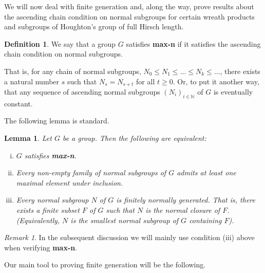 \documentclass[11pt,a4paper]{amsart}
\newtheorem{lemma}[theorem]{Lemma}
\theoremstyle{definition}
\newtheorem{definition}[theorem]{Definition}
\theoremstyle{remark}
\newtheorem{remark}[theorem]{Remark}
\newcommand{\N}{\mathbb N}
\begin{document}
We will now deal with finite generation and, along the way, prove results about the ascending chain condition on normal subgroups for certain wreath products and subgroups of Houghton's group of full Hirsch length. 

\begin{definition}
	\label{maxn}
	We say that a group $G$ satisfies \textbf{max-n} if it satisfies the ascending chain condition on normal subgroups. 
	
	That is, for any chain of normal subgroups, $N_0 \leq N_1 \leq \ldots \leq N_k \leq \ldots$, there exists a natural number $s$ such that $N_s=N_{s+t}$ for all $t \geq 0$. Or, to put it another way, that any sequence of ascending normal subgroups $(N_i)_{i\in\N}$ of $G$ is eventually constant.
\end{definition}

The following lemma is standard.

\begin{lemma}
	Let $G$ be a group. Then the following are equivalent:
	\begin{enumerate}[(i)]
		\item $G$ satisfies \textbf{max-n}.
		\item Every non-empty family of normal subgroups of $G$ admits at least one maximal element under inclusion.
		\item Every normal subgroup $N$ of $G$ is finitely normally generated. That is, there exists a finite subset $F$ of $G$ such that $N$ is the normal closure of $F$. (Equivalently, $N$ is the smallest normal subgroup of $G$ containing $F$).
	\end{enumerate}
\end{lemma}


\begin{remark}
	In the subsequent discussion we will mainly use condition (iii) above when verifying \textbf{max-n}.
\end{remark}

Our main tool to proving finite generation will be the following. 
\end{document}
